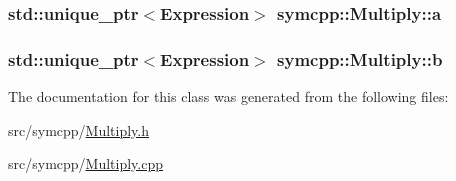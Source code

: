 \subsubsection[{\texorpdfstring{a}{a}}]{\setlength{\rightskip}{0pt plus 5cm}std\+::unique\+\_\+ptr$<${\bf Expression}$>$ symcpp\+::\+Multiply\+::a\hspace{0.3cm}{\ttfamily [private]}}\hypertarget{classsymcpp_1_1Multiply_a8ed32ccb235cea51161dd0fd25ea130d}{}\label{classsymcpp_1_1Multiply_a8ed32ccb235cea51161dd0fd25ea130d}
\subsubsection[{\texorpdfstring{b}{b}}]{\setlength{\rightskip}{0pt plus 5cm}std\+::unique\+\_\+ptr$<${\bf Expression}$>$ symcpp\+::\+Multiply\+::b\hspace{0.3cm}{\ttfamily [private]}}\hypertarget{classsymcpp_1_1Multiply_a3d7a1b6e6e35585098b25f8b3a59e6ae}{}\label{classsymcpp_1_1Multiply_a3d7a1b6e6e35585098b25f8b3a59e6ae}


The documentation for this class was generated from the following files\+:\begin{DoxyCompactItemize}
\item 
src/symcpp/\hyperlink{Multiply_8h}{Multiply.\+h}\item 
src/symcpp/\hyperlink{Multiply_8cpp}{Multiply.\+cpp}\end{DoxyCompactItemize}
